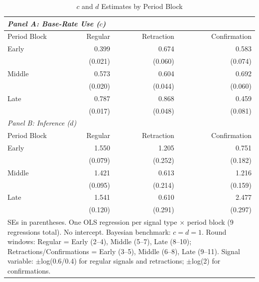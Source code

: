 \begin{table}[htbp]
\centering
\caption{$c$ and $d$ Estimates by Period Block}
\label{tab:cd_by_period}
\begin{tabular}{lrrr}
\hline
\multicolumn{4}{l}{\textit{Panel A: Base-Rate Use ($c$)}} \\
\hline
Period Block & Regular & Retraction & Confirmation \\
\hline
Early & 0.399 & 0.674 & 0.583
 \\
 & (0.021) & (0.060) & (0.074)
 \\
Middle & 0.573 & 0.604 & 0.692
 \\
 & (0.020) & (0.044) & (0.060)
 \\
Late & 0.787 & 0.868 & 0.459
 \\
 & (0.017) & (0.048) & (0.081)
 \\
\hline

\multicolumn{4}{l}{\textit{Panel B: Inference ($d$)}} \\
\hline
Period Block & Regular & Retraction & Confirmation \\
\hline
Early & 1.550 & 1.205 & 0.751
 \\
 & (0.079) & (0.252) & (0.182)
 \\
Middle & 1.421 & 0.613 & 1.216
 \\
 & (0.095) & (0.214) & (0.159)
 \\
Late & 1.541 & 0.610 & 2.477
 \\
 & (0.120) & (0.291) & (0.297)
 \\
\hline

\multicolumn{4}{p{0.85\textwidth}}{\small SEs in parentheses. One OLS regression per signal type $\times$ period block (9 regressions total). No intercept. Bayesian benchmark: $c=d=1$. Round windows: Regular = Early (2--4), Middle (5--7), Late (8--10); Retractions/Confirmations = Early (3--5), Middle (6--8), Late (9--11). Signal variable: $\pm$log(0.6/0.4) for regular signals and retractions; $\pm$log(2) for confirmations.} \\
\end{tabular}
\end{table}
